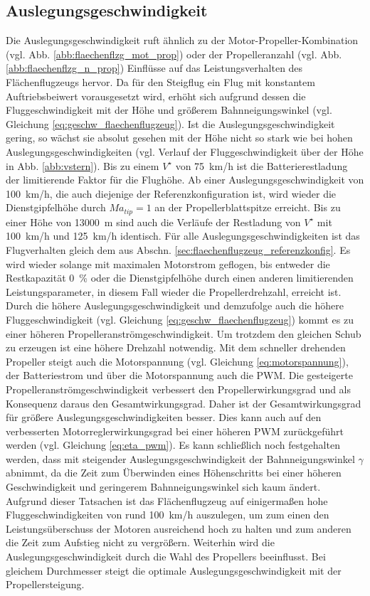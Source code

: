 \subsection{Auslegungsgeschwindigkeit}
\label{subsec:vstern}
Die Auslegungsgeschwindigkeit ruft ähnlich zu der Motor-Propeller-Kombination (vgl. Abb. \ref{abb:flaechenflzg_mot_prop}) oder der Propelleranzahl (vgl. Abb. \ref{abb:flaechenflzg_n_prop}) Einflüsse auf das Leistungsverhalten des Flächenflugzeugs hervor. Da für den Steigflug ein Flug mit konstantem Auftriebsbeiwert vorausgesetzt wird, erhöht sich aufgrund dessen die Fluggeschwindigkeit mit der Höhe und größerem Bahnneigungswinkel (vgl. Gleichung \eqref{eq:geschw_flaechenflugzeug}).
Ist die Auslegungsgeschwindigkeit gering, so wächst sie absolut gesehen mit der Höhe nicht so stark wie bei hohen Auslegungsgeschwindigkeiten (vgl. Verlauf der Fluggeschwindigkeit über der Höhe in Abb. \ref{abb:vstern}). 
Bis zu einem \ensuremath{V^\star} von \SI{75}{km/h} ist die Batterierestladung der limitierende Faktor für die Flughöhe. Ab einer Auslegungsgeschwindigkeit von \SI{100}{km/h}, die auch diejenige der Referenzkonfiguration ist, wird wieder die Dienstgipfelhöhe durch \ensuremath{Ma_{tip} = 1} an der Propellerblattspitze erreicht. Bis zu einer Höhe von \SI{13000}{m} sind auch die Verläufe der Restladung von \ensuremath{V^\star} mit \SI{100}{km/h} und \SI{125}{km/h} identisch. Für alle Auslegungsgeschwindigkeiten ist das Flugverhalten gleich dem aus Abschn. \ref{sec:flaechenflugzeug_referenzkonfig}. Es wird wieder solange mit maximalen Motorstrom geflogen, bis entweder die Restkapazität \SI{0}{\%} oder die Dienstgipfelhöhe durch einen anderen limitierenden Leistungsparameter, in diesem Fall wieder die Propellerdrehzahl, erreicht ist. Durch die höhere Auslegungsgeschwindigkeit und demzufolge auch die höhere Fluggeschwindigkeit (vgl. Gleichung \eqref{eq:geschw_flaechenflugzeug}) kommt es zu einer höheren Propelleranströmgeschwindigkeit. Um trotzdem den gleichen Schub zu erzeugen ist eine höhere Drehzahl notwendig. Mit dem schneller drehenden Propeller steigt auch die Motorspannung (vgl. Gleichung \eqref{eq:motorspannung}), der Batteriestrom und über die Motorspannung auch die PWM. Die gesteigerte Propelleranströmgeschwindigkeit verbessert den Propellerwirkungsgrad und als Konsequenz daraus den Gesamtwirkungsgrad. Daher ist der Gesamtwirkungsgrad für größere Auslegungsgeschwindigkeiten besser. Dies kann auch auf den verbesserten Motorreglerwirkungsgrad bei einer höheren PWM zurückgeführt werden (vgl. Gleichung \eqref{eq:eta_pwm}). Es kann schließlich noch festgehalten werden, dass mit steigender Auslegungsgeschwindigkeit der Bahnneigungswinkel \ensuremath{\gamma} abnimmt, da die Zeit zum Überwinden eines Höhenschritts bei einer höheren Geschwindigkeit und geringerem Bahnneigungswinkel sich kaum ändert. \\
Aufgrund dieser Tatsachen ist das Flächenflugzeug auf einigermaßen hohe Fluggeschwindigkeiten von rund \SI{100}{km/h} auszulegen, um zum einen den Leistungsüberschuss der Motoren ausreichend hoch zu halten und zum anderen die Zeit zum Aufstieg nicht zu vergrößern. Weiterhin wird die Auslegungsgeschwindigkeit durch die Wahl des Propellers beeinflusst. Bei gleichem Durchmesser steigt die optimale Auslegungsgeschwindigkeit mit der Propellersteigung.


